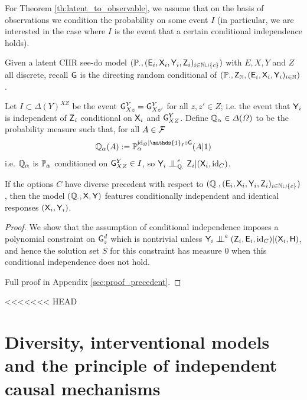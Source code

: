 For Theorem \ref{th:latent_to_observable}, we assume that on the basis of observations we condition the probability on some event $I$ (in particular, we are interested in the case where $I$ is the event that a certain conditional independence holds).

\begin{theorem}\label{th:latent_to_observable}
Given a latent CIIR see-do model $(\mathbb{P}_\cdot,(\mathsf{E}_i,\mathsf{X}_i,\mathsf{Y}_i,\mathsf{Z}_i)_{i\in\mathbb{N}\cup\{c\}})$ with $E,X,Y$ and $Z$ all discrete, recall $\mathsf{G}$ is the directing random conditional of $(\mathbb{P}_\cdot,\mathsf{Z}_{\mathbb{N}},(\mathsf{E}_i,\mathsf{X}_i,\mathsf{Y}_i)_{i\in \mathbb{N}})$.

Let $I\subset \Delta(Y)^{XZ}$ be the event $\mathsf{G}^Y_{Xz}=\mathsf{G}^Y_{Xz'}$ for all $z,z'\in Z$; i.e. the event that $\mathsf{Y}_i$ is independent of $\mathsf{Z}_i$ conditional on $\mathsf{X}_i$ and $\mathsf{G}^Y_{XZ}$. Define $\mathbb{Q}_\alpha\in \Delta(\Omega)$ to be the probability measure such that, for all $A\in \mathcal{F}$
\begin{align}
\prob{Q}_\alpha(A) := \prob{P}_\alpha^{\mathrm{id}_\Omega|\mathds{1}_I\circ \RV{G}}(A|1)
\end{align}
i.e. $\mathbb{Q}_\alpha$ is $\mathbb{P}_\alpha$ conditioned on $\mathsf{G}^Y_{XZ}\in I$, so $\RV{Y}_i\CI^e_{\prob{Q}_\cdot} \RV{Z}_i|(\RV{X}_i,\mathrm{id}_C)$.

If the options $C$ have diverse precedent with respect to $(\mathbb{Q}_\cdot,(\mathsf{E}_i,\mathsf{X}_i,\mathsf{Y}_i,\mathsf{Z}_i)_{i\in\mathbb{N}\cup\{c\}})$, then the model $(\mathbb{Q}_\cdot,\mathsf{X},\mathsf{Y})$ features conditionally independent and identical responses $(\mathsf{X}_i,\mathsf{Y}_i)$.
\end{theorem}

\begin{proof}
We show that the assumption of conditional independence imposes a polynomial constraint on $\mathsf{G}^d_z$ which is nontrivial unless $\RV{Y}_i\CI^e (\RV{Z}_i,\RV{E}_i,\text{id}_C)|(\RV{X}_i,\RV{H})$, and hence the solution set $S$ for this constraint has measure 0 when this conditional independence does not hold.

Full proof in Appendix \ref{sec:proof_precedent}.
\end{proof}

<<<<<<< HEAD
\section[Independent mechanisms]{Diversity, interventional models and the principle of independent causal mechanisms}


